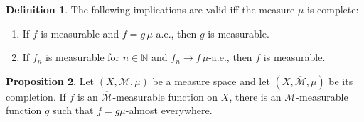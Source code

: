 \documentclass[12pt,a4paper]{book}
\newenvironment{enu}{\begin{enumerate}[(1)]}{\end{enumerate}}
\theoremstyle{definition}
\newtheorem{defn}{Definition}[section]
\newtheorem{prop}[defn]{Proposition}
\begin{document}
\begin{defn}
    The following implications are valid iff the measure $\mu$ is complete:
    \begin{enu}
        \item If $f$ is measurable and $f=g\, \mu$-a.e., then $g$ is measurable.

        \item If $f_n$ is measurable for $n \in \mathbb{N}$ and $f_n \rightarrow f\,\mu$-a.e., then $f$ is measurable.
    \end{enu}
\end{defn}
\begin{prop}
    Let $(X, \mathcal{M}, \mu)$ be a measure space and let $(X, \overline{\mathcal{M}}, \bar{\mu})$ be its completion. If $f$ is an $\overline{\mathcal{M}}$-measurable function on $X$, there is an $\mathcal{M}$-measurable function $g$ such that $f=g \bar{\mu}$-almost everywhere.
\end{prop}
\end{document}
